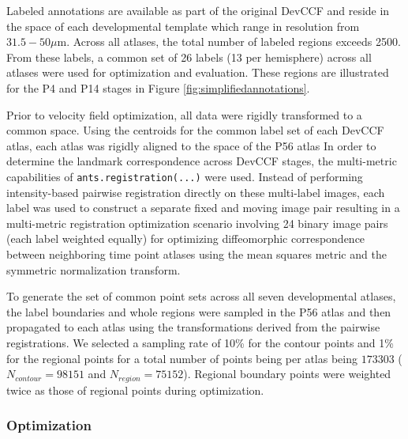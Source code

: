 \documentclass[
  12pt,
]{article}
\begin{document}
Labeled annotations are available as part of the original DevCCF and
reside in the space of each developmental template which range in
resolution from \(31.5-50 \mu\)m. Across all atlases, the total number
of labeled regions exceeds 2500. From these labels, a common set of 26
labels (13 per hemisphere) across all atlases were used for optimization
and evaluation. These regions are illustrated for the P4 and P14 stages
in Figure \ref{fig:simplifiedannotations}.

Prior to velocity field optimization, all data were rigidly transformed
to a common space. Using the centroids for the common label set of each
DevCCF atlas, each atlas was rigidly aligned to the space of the P56
atlas In order to determine the landmark correspondence across DevCCF
stages, the multi-metric capabilities of \texttt{ants.registration(...)}
were used. Instead of performing intensity-based pairwise registration
directly on these multi-label images, each label was used to construct a
separate fixed and moving image pair resulting in a multi-metric
registration optimization scenario involving 24 binary image pairs (each
label weighted equally) for optimizing diffeomorphic correspondence
between neighboring time point atlases using the mean squares metric and
the symmetric normalization transform.

To generate the set of common point sets across all seven developmental
atlases, the label boundaries and whole regions were sampled in the P56
atlas and then propagated to each atlas using the transformations
derived from the pairwise registrations. We selected a sampling rate of
10\% for the contour points and 1\% for the regional points for a total
number of points being per atlas being \(173303\)
(\(N_{contour} = 98151\) and \(N_{region}=75152\)). Regional boundary
points were weighted twice as those of regional points during
optimization.

\hypertarget{optimization-1}{%
\subsubsection*{Optimization}\label{optimization-1}}
\end{document}
